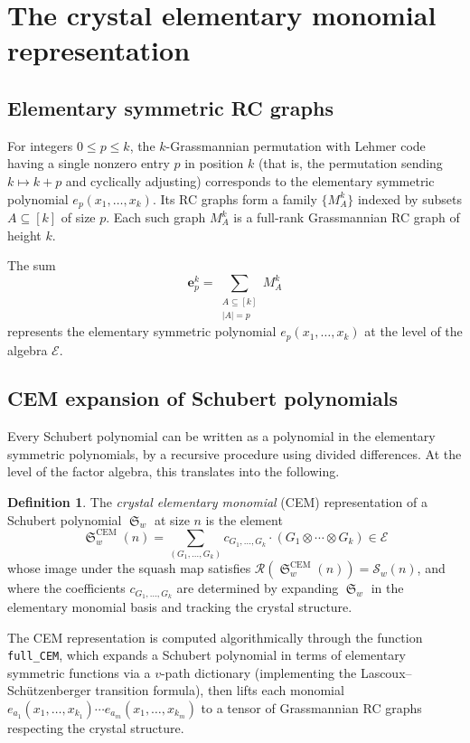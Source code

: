 \documentclass{amsart}
\theoremstyle{definition}
\newtheorem{definition}[lemma]{Definition}
\theoremstyle{remark}
\numberwithin{equation}{section}
\DeclareMathOperator{\sch}{\mathfrak{S}}
\begin{document}
\section{The crystal elementary monomial representation}\label{section:cem}

\subsection{Elementary symmetric RC graphs}

For integers $0 \leq p \leq k$, the $k$-Grassmannian permutation with Lehmer code having a single nonzero entry $p$ in position $k$ (that is, the permutation sending $k \mapsto k + p$ and cyclically adjusting) corresponds to the elementary symmetric polynomial $e_p(x_1, \ldots, x_k)$.  Its RC graphs form a family $\{M_A^k\}$ indexed by subsets $A \subseteq [k]$ of size $p$.  Each such graph $M_A^k$ is a full-rank Grassmannian RC graph of height $k$.

The sum
\[
\mathbf{e}_p^k = \sum_{\substack{A \subseteq [k] \\ |A| = p}} M_A^k
\]
represents the elementary symmetric polynomial $e_p(x_1, \ldots, x_k)$ at the level of the algebra $\mathcal{E}$.

\subsection{CEM expansion of Schubert polynomials}

Every Schubert polynomial can be written as a polynomial in the elementary symmetric polynomials, by a recursive procedure using divided differences.  At the level of the factor algebra, this translates into the following.

\begin{definition}\label{definition:cem}
The \textit{crystal elementary monomial} (CEM) representation of a Schubert polynomial $\sch_w$ at size $n$ is the element
\[
\sch_w^{\mathrm{CEM}}(n) = \sum_{(G_1, \ldots, G_k)} c_{G_1, \ldots, G_k} \cdot (G_1 \otimes \cdots \otimes G_k) \in \mathcal{E}
\]
whose image under the squash map satisfies $\mathcal{R}(\sch_w^{\mathrm{CEM}}(n)) = \mathcal{S}_w(n)$, and where the coefficients $c_{G_1, \ldots, G_k}$ are determined by expanding $\sch_w$ in the elementary monomial basis and tracking the crystal structure.
\end{definition}

The CEM representation is computed algorithmically through the function \texttt{full\_CEM}, which expands a Schubert polynomial in terms of elementary symmetric functions via a $v$-path dictionary (implementing the Lascoux--Sch\"utzenberger transition formula), then lifts each monomial $e_{a_1}(x_1, \ldots, x_{k_1}) \cdots e_{a_m}(x_1, \ldots, x_{k_m})$ to a tensor of Grassmannian RC graphs respecting the crystal structure.
\end{document}
